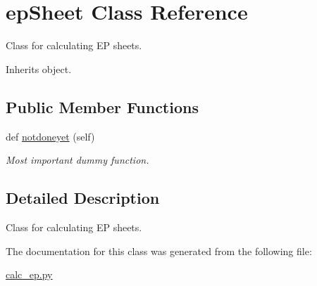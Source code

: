 \hypertarget{classcalc__ep_1_1epSheet}{}\section{ep\+Sheet Class Reference}
\label{classcalc__ep_1_1epSheet}


Class for calculating EP sheets.  




Inherits object.

\subsection*{Public Member Functions}
\begin{DoxyCompactItemize}
\item 
def \hyperlink{classcalc__ep_1_1epSheet_a2d865a6aea10146f28c546bed4ae1f44}{notdoneyet} (self)\hypertarget{classcalc__ep_1_1epSheet_a2d865a6aea10146f28c546bed4ae1f44}{}\label{classcalc__ep_1_1epSheet_a2d865a6aea10146f28c546bed4ae1f44}

\begin{DoxyCompactList}\small\item\em Most important dummy function. \end{DoxyCompactList}\end{DoxyCompactItemize}


\subsection{Detailed Description}
Class for calculating EP sheets. 

The documentation for this class was generated from the following file\+:\begin{DoxyCompactItemize}
\item 
\hyperlink{calc__ep_8py}{calc\+\_\+ep.\+py}\end{DoxyCompactItemize}
